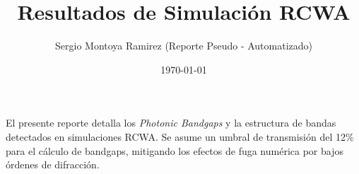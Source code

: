 \documentclass{article}
\begin{document}
\title{Resultados de Simulación RCWA}
\author{Sergio Montoya Ramirez (Reporte Pseudo - Automatizado)}
\date{\today}
\maketitle

El presente reporte detalla los \textit{Photonic Bandgaps} y la estructura de bandas detectados en simulaciones RCWA.
Se asume un umbral de transmisión del 12\% para el cálculo de bandgaps, mitigando los efectos de fuga numérica por bajos órdenes de difracción.
\clearpage



















































\end{document}
